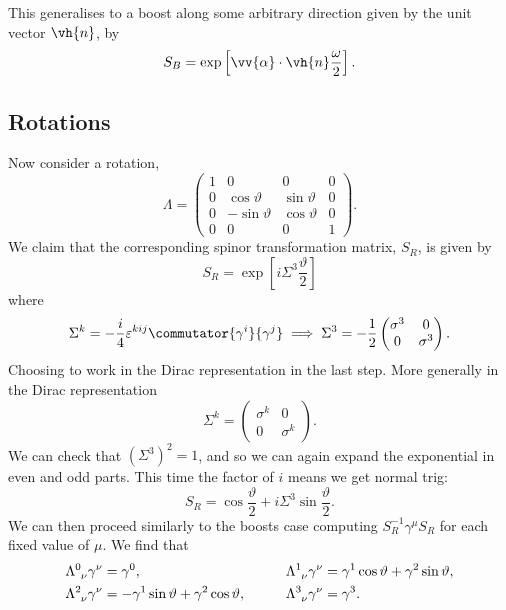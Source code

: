 \documentclass[fleqn]{NotesClass}
\begin{document}
    This generalises to a boost along some arbitrary direction given by the unit vector \(\vh{n}\), by
    \begin{equation}
        S_B = \exp\left[ \vv{\alpha} \cdot \vh{n} \frac{\omega}{2} \right].
    \end{equation}
    
    \subsection{Rotations}
    Now consider a rotation,
    \begin{equation}
        \Lambda = 
        \begin{pmatrix}
            1 & 0 & 0 & 0\\
            0 & \cos\vartheta & \sin\vartheta & 0\\
            0 & -\sin\vartheta & \cos\vartheta & 0\\
            0 & 0 & 0 & 1
        \end{pmatrix}
        .
    \end{equation}
    We claim that the corresponding spinor transformation matrix, \(S_R\), is given by
    \begin{equation}
        S_R = \exp\left[ i\Sigma^3 \frac{\vartheta}{2} \right]
    \end{equation}
    where
    \begin{equation}
        \Sigma^k = -\frac{i}{4}\varepsilon^{kij}\commutator{\gamma^i}{\gamma^j} \implies \Sigma^3 = -\frac{1}{2}
        \begin{pmatrix}
            \sigma^3 & 0\\
            0 & \sigma^3
        \end{pmatrix}
        .
    \end{equation}
    Choosing to work in the Dirac representation in the last step.
    More generally in the Dirac representation
    \begin{equation}
        \Sigma^k = 
        \begin{pmatrix}
            \sigma^k & 0\\
            0 & \sigma^k
        \end{pmatrix}
        .
    \end{equation}
    We can check that \((\Sigma^3)^2 = 1\), and so we can again expand the exponential in even and odd parts.
    This time the factor of \(i\) means we get normal trig:
    \begin{equation}
        S_R = \cos\frac{\vartheta}{2} + i\Sigma^3 \sin\frac{\vartheta}{2}.
    \end{equation}
    We can then proceed similarly to the boosts case computing \(S_R^{-1}\gamma^\mu S_R\) for each fixed value of \(\mu\).
    We find that
    \begin{alignat}{2}
        \tensor{\Lambda}{^0_\nu}\gamma^\nu &= \gamma^0, \qquad & \tensor{\Lambda}{^1_\nu}\gamma^\nu &= \gamma^1\cos\vartheta + \gamma^2\sin\vartheta,\\
        \tensor{\Lambda}{^2_\nu}\gamma^\nu &= -\gamma^1\sin\vartheta + \gamma^2\cos\vartheta, \qquad & \tensor{\Lambda}{^3_\nu}\gamma^\nu &= \gamma^3.
    \end{alignat}
    
\end{document}
